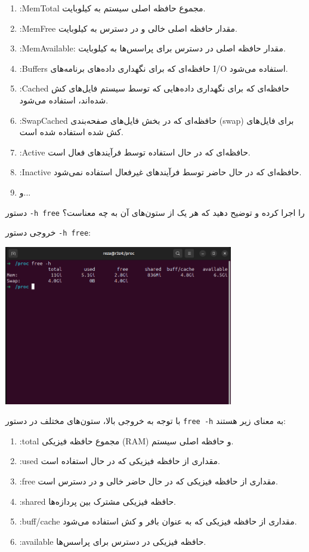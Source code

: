 \begin{qsolve}
	\begin{enumerate}
		\item :MemTotal مجموع حافظه اصلی سیستم به کیلوبایت.
		\item :MemFree مقدار حافظه اصلی خالی و در دسترس به کیلوبایت.
		\item :MemAvailable: مقدار حافظه اصلی در دسترس برای پراسس‌ها به کیلوبایت.
		\item :Buffers حافظه‌ای که برای نگهداری داده‌های برنامه‌های I/O استفاده می‌شود.
		\item :Cached حافظه‌ای که برای نگهداری داده‌هایی که توسط سیستم فایل‌های کش شده‌اند، استفاده می‌شود.
		\item :SwapCached حافظه‌ای که در بخش فایل‌های صفحه‌بندی (swap) برای فایل‌های کش شده استفاده شده است.
		\item :Active حافظه‌ای که در حال استفاده توسط فرآیندهای فعال است.
		\item :Inactive حافظه‌ای که در حال حاضر توسط فرآیندهای غیرفعال استفاده نمی‌شود.
		\item و...
	\end{enumerate}
	
	
	
		دستور \texttt{-h free} را اجرا کرده و توضیح دهید که هر یک از ستون‌های آن به چه معناست؟

خروجی دستور \texttt{-h free}:

\begin{center}
	\includegraphics[width=10cm]{pics/img5.png}
\end{center}

با توجه به خروجی بالا، ستون‌های مختلف در دستور \texttt{free -h} به معنای زیر هستند:
\begin{enumerate}
	\item :total مجموع حافظه فیزیکی (RAM) و حافظه اصلی سیستم.
	\item :used مقداری از حافظه فیزیکی که در حال استفاده است.
	\item :free مقداری از حافظه فیزیکی که در حال حاضر خالی و در دسترس است.
	\item :shared حافظه فیزیکی مشترک بین پردازه‌ها.
	\item :buff/cache مقداری از حافظه فیزیکی که به عنوان بافر و کش استفاده می‌شود.
	\item :available حافظه فیزیکی در دسترس برای پراسس‌ها.
\end{enumerate}


\end{qsolve}



